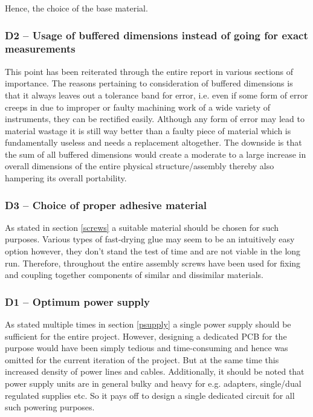 Hence, the choice of the base material.

\subsubsection*{D2 – Usage of buffered dimensions instead of going for exact measurements}

This point has been reiterated through the entire report in various sections of importance. The reasons pertaining to consideration of buffered dimensions is that it always leaves out a tolerance band for error, i.e. even if some form of error creeps in due to improper or faulty machining work of a wide variety of instruments, they can be rectified easily. Although any form of error may lead to material wastage it is still way better than a faulty piece of material which is fundamentally useless and needs a replacement altogether. The downside is that the sum of all buffered dimensions would create a moderate to a large increase in overall dimensions of the entire physical structure/assembly thereby also hampering its overall portability.

\subsubsection*{D3 – Choice of proper adhesive material}

As stated in section \ref{screws} a suitable material should be chosen for such purposes. Various types of fast-drying glue may seem to be an intuitively easy option however, they don’t stand the test of time and are not viable in the long run. Therefore, throughout the entire assembly screws have been used for fixing and coupling together components of similar and dissimilar materials.

\subsubsection*{D1 – Optimum power supply}

As stated multiple times in section \ref{psupply} a single power supply should be sufficient for the entire project. However, designing a dedicated PCB for the purpose would have been simply tedious and time-consuming and hence was omitted for the current iteration of the project. But at the same time this increased density of power lines and cables. Additionally, it should be noted that power supply units are in general bulky and heavy for e.g. adapters, single/dual regulated supplies etc. So it pays off to design a single dedicated circuit for all such powering purposes.


